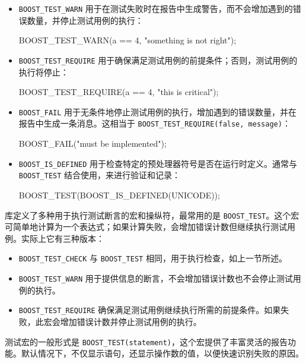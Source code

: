 \begin{itemize}
\item
\verb|BOOST_TEST_WARN| 用于在测试失败时在报告中生成警告，而不会增加遇到的错误数量，并停止测试用例的执行：

\begin{cpp}
BOOST_TEST_WARN(a == 4, "something is not right");
\end{cpp}

\item
\verb|BOOST_TEST_REQUIRE| 用于确保满足测试用例的前提条件；否则，测试用例的执行将停止：

\begin{cpp}
BOOST_TEST_REQUIRE(a == 4, "this is critical");
\end{cpp}

\item
\verb|BOOST_FAIL| 用于无条件地停止测试用例的执行，增加遇到的错误数量，并在报告中生成一条消息。这相当于 \verb|BOOST_TEST_REQUIRE(false, message)|：

\begin{cpp}
BOOST_FAIL("must be implemented");
\end{cpp}

\item
\verb|BOOST_IS_DEFINED| 用于检查特定的预处理器符号是否在运行时定义。通常与 \verb|BOOST_TEST| 结合使用，来进行验证和记录：

\begin{cpp}
BOOST_TEST(BOOST_IS_DEFINED(UNICODE));
\end{cpp}
\end{itemize}


库定义了多种用于执行测试断言的宏和操纵符，最常用的是 \verb|BOOST_TEST|。这个宏可简单地计算为一个表达式；如果计算失败，会增加错误计数但继续执行测试用例。实际上它有三种版本：

\begin{itemize}
\item
\verb|BOOST_TEST_CHECK| 与 \verb|BOOST_TEST| 相同，用于执行检查，如上一节所述。

\item
\verb|BOOST_TEST_WARN| 用于提供信息的断言，不会增加错误计数也不会停止测试用例的执行。

\item
\verb|BOOST_TEST_REQUIRE| 确保满足测试用例继续执行所需的前提条件。如果失败，此宏会增加错误计数并停止测试用例的执行。
\end{itemize}

测试宏的一般形式是 \verb|BOOST_TEST(statement)|，这个宏提供了丰富灵活的报告功能。默认情况下，不仅显示语句，还显示操作数的值，以便快速识别失败的原因。

